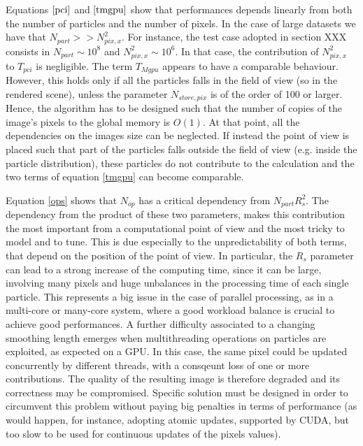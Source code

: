 \documentclass[11pt]{article}
\begin{document}
Equations $\eqref{pci}$ and $\eqref{tmgpu}$ show that performances
depends linearly from both the number of particles and the number of pixels. 
In the case of large datasets we have that
$N_{part} >> N_{pix,x}^2$. For instance, the test case adopted 
in section XXX consists in $N_{part} \sim 10^8$
and $N_{pix,x}^2 \sim 10^6$. 
In that case, the contribution of $N_{pix,x}^2$ 
to $T_{pci}$ is negligible. 
The term $T_{Mgpu}$ appears to have a comparable behaviour. However, 
this holds only if all the particles falls in the field of view (so in
the rendered scene),  unless the 
parameter $N_{store,pix}$ is of the order of 100 or larger. Hence, the algorithm has to
be designed such that the number of copies of the image's pixels to the 
global memory is $O(1)$. At that point, all the dependencies on the images size can
be neglected. If instead the point of view is placed such that part of the particles 
falls outside the field of view (e.g. inside the particle distribution), these 
particles do not contribute to the calculation and the two terms of equation 
\eqref{tmgpu} can become comparable.

Equation \eqref{ops} shows that $N_{op}$ has a critical dependency from 
$N_{part} R_s^2$. The dependency from the product of these two parameters, makes 
this contribution the most important from a computational point of view and the most
tricky to model and to tune. This is due especially to the unpredictability of
both terms, that depend on the position of the point of view. In particular, 
the $R_s$ parameter can lead to a strong increase of the computing time, since 
it can be large, involving many pixels and huge unbalances in the processing 
time of each single particle. This
represents a big issue in the case of parallel processing, as in a multi-core or
many-core system, where a good workload balance is crucial to achieve good performances.
A further difficulty associated to a changing smoothing length emerges when 
multithreading operations on particles are exploited, as expected on a GPU. 
In this case, the same pixel could be updated concurrently by different threads,
with a consqeunt loss of one or more contributions.
The quality of the resulting image is therefore degraded and its correctness may be
compromised.
Specific solution must be designed in order to circumvent this problem 
without paying big penalties in terms of performance (as would happen, for instance,
adopting atomic updates, supported by CUDA, but too slow to be used for continuous 
updates of the pixels values).
\end{document}

